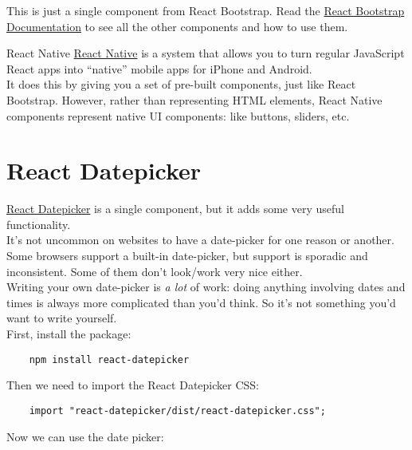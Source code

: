 This is just a single component from React Bootstrap. Read the \href{https://react-bootstrap.github.io/getting-started/introduction/}{React Bootstrap Documentation} to see all the other components and how to use them.

\begin{infobox}{React Native}
    \href{https://facebook.github.io/react-native/}{React Native} is a system that allows you to turn regular JavaScript React apps into ``native'' mobile apps for iPhone and Android.
    \\

    It does this by giving you a set of pre-built components, just like React Bootstrap. However, rather than representing HTML elements, React Native components represent native UI components: like buttons, sliders, etc.
\end{infobox}


\section{React Datepicker}

\href{https://github.com/Hacker0x01/react-datepicker/}{React Datepicker} is a single component, but it adds some very useful functionality.
\\

It's not uncommon on websites to have a date-picker for one reason or another. Some browsers support a built-in date-picker, but support is sporadic and inconsistent. Some of them don't look/work very nice either.
\\

Writing your own date-picker is \textit{a lot} of work: doing anything involving dates and times is always more complicated than you'd think. So it's not something you'd want to write yourself.
\\

First, install the package:

\begin{verbatim}
    npm install react-datepicker
\end{verbatim}

Then we need to import the React Datepicker CSS:

\begin{verbatim}
    import "react-datepicker/dist/react-datepicker.css";
\end{verbatim}

Now we can use the date picker:

\inputminted{js}{06/figures/01/02-Dates.js}

